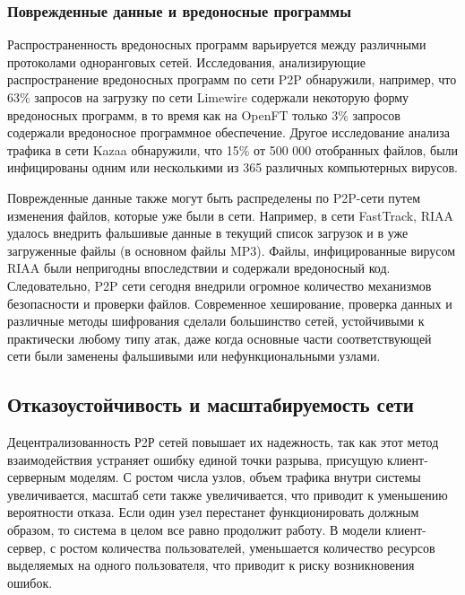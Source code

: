 \documentclass[bachelor, och, coursework]{SCWorks}
\begin{document}
\subsubsection{Поврежденные данные и вредоносные программы}
Распространенность вредоносных программ варьируется между различными протоколами одноранговых сетей. Исследования, анализирующие распространение вредоносных программ по сети P2P обнаружили, например, что 63\% запросов на загрузку по сети Limewire содержали некоторую форму вредоносных программ, в то время как на OpenFT только 3\% запросов содержали вредоносное программное обеспечение. Другое исследование анализа трафика в сети Kazaa обнаружили, что 15\% от 500 000 отобранных файлов, были инфицированы одним или несколькими из 365 различных компьютерных вирусов.

Поврежденные данные также могут быть распределены по P2P-сети путем изменения файлов, которые уже были в сети. Например, в сети FastTrack, RIAA удалось внедрить фальшивые данные в текущий список загрузок и в уже загруженные файлы (в основном файлы MP3). Файлы, инфицированные вирусом RIAA были непригодны впоследствии и содержали вредоносный код. Следовательно, P2P сети сегодня внедрили огромное количество механизмов безопасности и проверки файлов. Современное хеширование, проверка данных и различные методы шифрования сделали большинство сетей, устойчивыми к практически любому типу атак, даже когда основные части соответствующей сети были заменены фальшивыми или нефункциональными узлами.

\subsection{Отказоустойчивость и масштабируемость сети}
Децентрализованность Р2Р сетей повышает их надежность, так как этот метод взаимодействия устраняет ошибку единой точки разрыва, присущую клиент-серверным моделям. С ростом числа узлов, объем трафика внутри системы увеличивается, масштаб сети также увеличивается, что приводит к уменьшению вероятности отказа. Если один узел перестанет функционировать должным образом, то система в целом все равно продолжит работу. В модели клиент-сервер, с ростом количества пользователей, уменьшается количество ресурсов выделяемых на одного пользователя, что приводит к риску возникновения ошибок.
\end{document}
